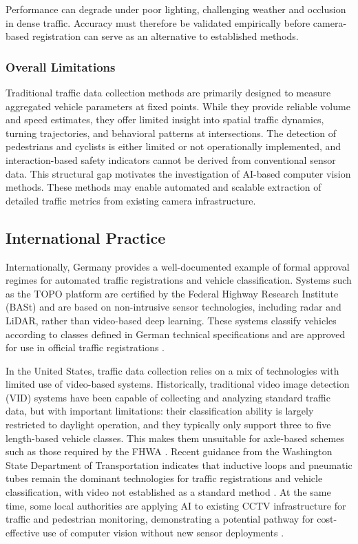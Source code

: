 Performance can degrade under poor lighting, challenging weather and occlusion in dense traffic. Accuracy must therefore be validated empirically before camera-based registration can serve as an alternative to established methods.

\subsubsection{Overall Limitations}
Traditional traffic data collection methods are primarily designed to measure aggregated vehicle parameters at fixed points. While they provide reliable volume and speed estimates, they offer limited insight into spatial traffic dynamics, turning trajectories, and behavioral patterns at intersections. The detection of pedestrians and cyclists is either limited or not operationally implemented, and interaction-based safety indicators cannot be derived from conventional sensor data. This structural gap motivates the investigation of AI-based computer vision methods. These methods may enable automated and scalable extraction of detailed traffic metrics from existing camera infrastructure.


\subsection{International Practice}
\label{sec:international_practice}
Internationally, Germany provides a well-documented example of formal approval regimes for automated traffic registrations and vehicle classification. Systems such as the TOPO platform are certified by the Federal Highway Research Institute (BASt) and are based on non-intrusive sensor technologies, including radar and LiDAR, rather than video-based deep learning. These systems classify vehicles according to classes defined in German technical specifications and are approved for use in official traffic registrations \citep{RTBGmbHCoKG2019}.

In the United States, traffic data collection relies on a mix of technologies with limited use of video-based systems. Historically, traditional video image detection (VID) systems have been capable of collecting and analyzing standard traffic data, but with important limitations: their classification ability is largely restricted to daylight operation, and they typically only support three to five length-based vehicle classes. This makes them unsuitable for axle-based schemes such as those required by the FHWA \citep{FHWA2014VID}. Recent guidance from the Washington State Department of Transportation indicates that inductive loops and pneumatic tubes remain the dominant technologies for traffic registrations and vehicle classification, with video not established as a standard method \citep{WSDOT2024}. At the same time, some local authorities are applying AI to existing CCTV infrastructure for traffic and pedestrian monitoring, demonstrating a potential pathway for cost-effective use of computer vision without new sensor deployments \citep{ITSKRSComputerVisionCCTV}.

